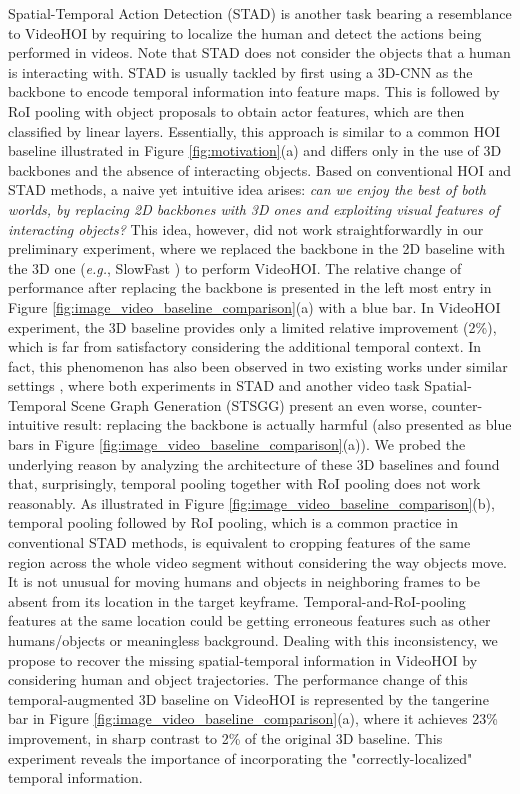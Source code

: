 \documentclass[sigconf]{acmart}
\begin{document}
Spatial-Temporal Action Detection (STAD) is another task bearing a resemblance to VideoHOI by requiring to localize the human and detect the actions being performed in videos. 
Note that STAD does not consider the objects that a human is interacting with.
STAD is usually tackled by first using a 3D-CNN \cite{tran2015learning,carreira2017quo} as the backbone to encode temporal information into feature maps.
This is followed by RoI pooling with object proposals to obtain actor features, which are then classified by linear layers. 
Essentially, this approach is similar to a common HOI baseline illustrated in Figure \ref{fig:motivation}(a) and differs only in the use of 3D backbones and the absence of interacting objects.
Based on conventional HOI and STAD methods, a naive yet intuitive idea arises: \textit{can we enjoy the best of both worlds, by replacing 2D backbones with 3D ones and exploiting visual features of interacting objects?}
This idea, however, did not work straightforwardly in our preliminary experiment, where we replaced the backbone in the 2D baseline \cite{wan2019pose} with the 3D one (\emph{e.g.}, SlowFast \cite{feichtenhofer2019slowfast}) to perform VideoHOI.
The relative change of performance after replacing the backbone is presented in the left most entry in Figure \ref{fig:image_video_baseline_comparison}(a) with a blue bar. 
In VideoHOI experiment, the 3D baseline provides only a limited relative improvement (2\%), which is far from satisfactory considering the additional temporal context.
In fact, this phenomenon has also been observed in two existing works under similar settings \cite{gu2018ava,ji2020action}, where both experiments in STAD and another video task Spatial-Temporal Scene Graph Generation (STSGG) present an even worse, counter-intuitive result: replacing the backbone is actually harmful (also presented as blue bars in Figure \ref{fig:image_video_baseline_comparison}(a)).
We probed the underlying reason by analyzing the architecture of these 3D baselines and found that, surprisingly, temporal pooling together with RoI pooling does not work reasonably.
As illustrated in Figure \ref{fig:image_video_baseline_comparison}(b), temporal pooling followed by RoI pooling, which is a common practice in conventional STAD methods, is equivalent to cropping features of the same region across the whole video segment without considering the way objects move.
It is not unusual for moving humans and objects in neighboring frames to be absent from its location in the target keyframe. 
Temporal-and-RoI-pooling features at the same location could be getting erroneous features such as other humans/objects or meaningless background.
Dealing with this inconsistency, we propose to recover the missing spatial-temporal information in VideoHOI by considering human and object trajectories. 
The performance change of this temporal-augmented 3D baseline on VideoHOI is represented by the tangerine bar in Figure \ref{fig:image_video_baseline_comparison}(a), where it achieves 23\% improvement, in sharp contrast to 2\% of the original 3D baseline.
This experiment reveals the importance of incorporating the "correctly-localized" temporal information.
\end{document}
